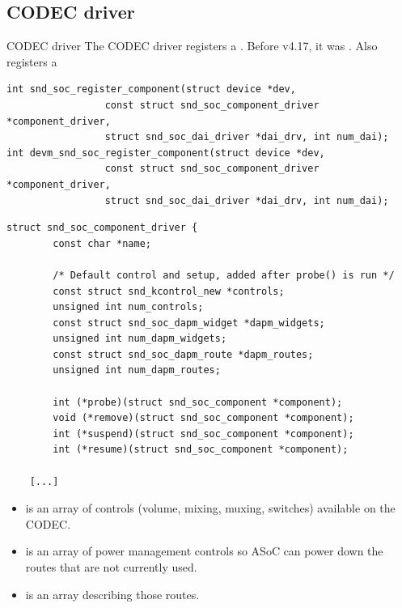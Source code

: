 
\subsection{CODEC driver}

\begin{frame}[fragile]{CODEC driver}
  The CODEC driver registers a .
  Before v4.17, it was .
  Also registers a 

  \begin{block}{}
    \fontsize{9}{9}\selectfont
    \begin{verbatim}
int snd_soc_register_component(struct device *dev,
                 const struct snd_soc_component_driver *component_driver,
                 struct snd_soc_dai_driver *dai_drv, int num_dai);
int devm_snd_soc_register_component(struct device *dev,
                 const struct snd_soc_component_driver *component_driver,
                 struct snd_soc_dai_driver *dai_drv, int num_dai);
    \end{verbatim}
  \end{block}
\end{frame}

\begin{frame}[fragile]{}
  \begin{block}{}
    \fontsize{9}{9}\selectfont
    \begin{verbatim}
struct snd_soc_component_driver {
        const char *name;

        /* Default control and setup, added after probe() is run */
        const struct snd_kcontrol_new *controls;
        unsigned int num_controls;
        const struct snd_soc_dapm_widget *dapm_widgets;
        unsigned int num_dapm_widgets;
        const struct snd_soc_dapm_route *dapm_routes;
        unsigned int num_dapm_routes;

        int (*probe)(struct snd_soc_component *component);
        void (*remove)(struct snd_soc_component *component);
        int (*suspend)(struct snd_soc_component *component);
        int (*resume)(struct snd_soc_component *component);

    [...]
    \end{verbatim}
  \end{block}
\end{frame}

\begin{frame}{}
  \begin{itemize}
  \item {} is an array of
    controls (volume, mixing, muxing, switches) available on the
    CODEC.
  \item {} is an array of
    power management controls so ASoC can power down the routes that
    are not currently used.
  \item {} is an array
    describing those routes.
  \end{itemize}
\end{frame}

